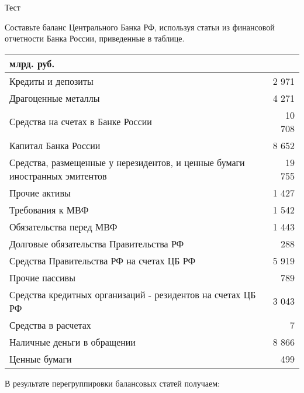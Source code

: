 \documentclass[12pt, table]{exam}
\begin{document}
\setcounter{section}{0\relax}%
\noindent
\normalsize

\begin{questions}
\question[40] Тест
\answerstotest

\pagebreak
\question[10] Составьте баланс Центрального Банка РФ, используя статьи из финансовой отчетности Банка России, приведенные в таблице. 

\small
\begin{tabularx}{\linewidth}[b]{@{}>{\raggedright\arraybackslash}Xr@{}}
	млрд. руб.\\
	\toprule
    Кредиты и депозиты &               2 971    \\
	Драгоценные металлы &               4 271    \\
	Средства на счетах в Банке России &             10 708    \\
	Капитал Банка России &               8 652    \\
	Средства, размещенные у нерезидентов, и ценные бумаги иностранных эмитентов &             19 755    \\
	Прочие активы &               1 427    \\
	Требования к МВФ &               1 542    \\
	Обязательства перед МВФ &               1 443    \\
	Долговые обязательства Правительства РФ &                  288    \\
	Средства Правительства РФ на счетах ЦБ РФ &               5 919    \\
	Прочие пассивы &                  789    \\
	Средства кредитных организаций - резидентов на счетах ЦБ РФ &               3 043    \\
	Средства в расчетах &                      7    \\
	Наличные деньги в обращении &               8 866    \\
	Ценные бумаги &                  499    \\
	\bottomrule
\end{tabularx}%
\normalsize
\begin{solution}[12em] В результате перегруппировки балансовых статей получаем:
	

\end{solution}
\end{questions}
\end{document}
